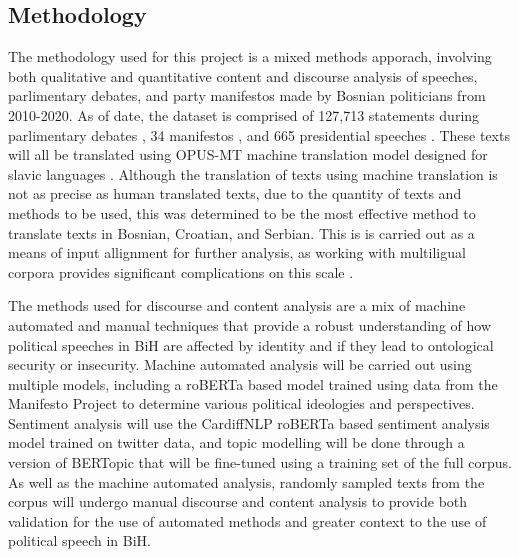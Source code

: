 \subsection*{Methodology}

The methodology used for this project is a mixed methods apporach, involving both qualitative and quantitative content and discourse analysis of speeches, parlimentary debates, and party manifestos made by Bosnian politicians from 2010-2020. As of date, the dataset is comprised of 127,713 statements during parlimentary debates \Parencite[][]{mochtak2022}, 34 manifestos \Parencite{lfabilrrz25}, and 665 presidential speeches \Parencite{Speeches}. These texts will all be translated using OPUS-MT machine translation model designed for slavic languages \Parencite{tiedemann2020}. Although the translation of texts using machine translation is not as precise as human translated texts, due to the quantity of texts and methods to be used, this was determined to be the most effective method to translate texts in Bosnian, Croatian, and Serbian. This is is carried out as a means of input allignment for further analysis, as working with multiligual corpora provides significant complications on this scale \Parencite[][p. 9-10]{haukelicht2023}.

The methods used for discourse and content analysis are a mix of machine automated and manual techniques that provide a robust understanding of how political speeches in BiH are affected by identity and if they lead to ontological security or insecurity. Machine automated analysis will be carried out using multiple models, including a roBERTa based model trained using data from the Manifesto Project \parencite*{burst2024} to determine various political ideologies and perspectives. Sentiment analysis will use the CardiffNLP roBERTa based sentiment analysis model \parencite*{camacho-collados-etal-2022-tweetnlp} trained on twitter data, and topic modelling will be done through a version of BERTopic \parencite*{grootendorst2022bertopic} that will be fine-tuned using a training set of the full corpus. As well as the machine automated analysis, randomly sampled texts from the corpus will undergo manual discourse and content analysis to provide both validation for the use of automated methods and greater context to the use of political speech in BiH.